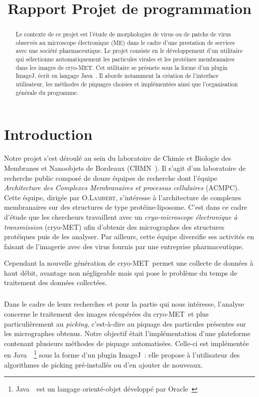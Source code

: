 \documentclass[12pt,a4paper]{report}
\title{Rapport Projet de programmation}
\begin{document}

\newcommand{\cme}{cryo-MET}
\newcommand{\java}{Java~{\tiny \texttrademark}}
\newcommand{\js}{JavaScript}
\newcommand{\imj}{ImageJ}

\begin{abstract}
Le contexte de ce projet est l'étude de morphologies de virus ou de patchs de virus observés au microscope électronique (ME) dans le cadre d'une prestation de services avec une société pharmaceutique. Le projet consiste en le développement d'un utilitaire qui sélectionne automatiquement les particules virales et les protéines membranaires dans les images de \cme. Cet utilitaire se présnete sous la forme d'un plugin \imj, écrit en  langage \java.
Il aborde notamment la création de l'interface utilisateur, les méthodes de piquages choisies et implémentées ainsi que l'organisation générale du programme. 
\end{abstract}

\tableofcontents
\chapter*{Introduction}

Notre projet s'est déroulé au sein du laboratoire de Chimie et Biologie des Membranes et Nanoobjets de Bordeaux (CBMN~\cite{cbmn:url}).
Il s'agit d'un laboratoire de recherche public composé de douze équipes de recherche dont l'équipe \emph{Architecture des Complexes Membranaires et processus cellulaires} (ACMPC). %
Cette équipe, dirigée par O.\textsc{Lambert}, s'intéresse à l'architecture de complexes membranaires sur des structures de type protéine-liposome. C'est dans ce cadre d'étude que les chercheurs travaillent avec un \emph{cryo-microscope électronique à transmission} (\cme) afin d'obtenir des micrographes des structures protéiques puis de les analyser. Par ailleurs, cette équipe diversifie ses activités en faisant de l'imagerie avec des virus fournis par une entreprise pharmaceutique.

\noindent
Cependant la nouvelle génération de \cme ~permet une collecte de données à haut débit, avantage non négligeable mais qui pose le problème du temps de traitement des données collectées. %

\paragraph*{}
Dans le cadre de leurs recherches et pour la partie qui nous intéresse, l'analyse concerne le traitement des images récupérées du \cme\ et plus particulièrement au \emph{picking}, c'est-à-dire au piquage des particules présentes sur les micrographes obtenus. %
Notre objectif était l'implémentation d'une plateforme contenant plusieurs méthodes de piquage automatisées.
Celle-ci est implémentée en \java ~\footnote{\java\ est un langage orienté-objet développé par Oracle~\cite{java:url}} sous la forme d'un plugin \imj~\cite{imagej:url}: elle propose à l'utilisateur des algorithmes de picking pré-installés ou d'en ajouter de nouveaux.
\end{document}
